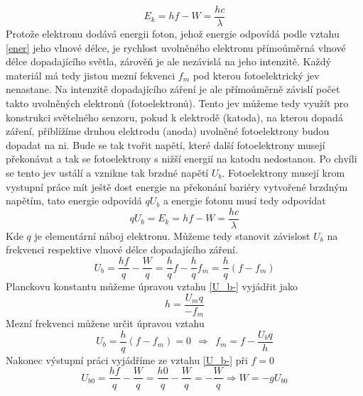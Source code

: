 \documentclass{article}
\begin{document}
\begin{equation}
    E_k=hf-W=\frac{hc}{\lambda}
    \label{E_ki}
\end{equation}
Protože elektronu dodává energii foton, jehož energie odpovídá podle vztahu \ref{ener} jeho vlnové délce, je rychlost uvolněného elektronu přímoúměrná vlnové délce dopadajícího světla, zárověň je ale nezávislá na jeho intenzitě.
Každý materiál má tedy jistou mezní fekvenci \(f_m\) pod kterou fotoelektrický jev nenastane.
Na intenzitě dopadajícího záření je ale přímoúměrně závislí počet takto uvolněných elektronů (fotoelektronů).
Tento jev můžeme tedy využít pro konstrukci světelného senzoru, pokud k elektrodě (katoda), na kterou dopadá záření, přiblížíme druhou elektrodu (anoda) uvolněné fotoelektrony budou dopadat na ni.
Bude se tak tvořit napětí, které další fotoelektrony musejí překonávat a tak se fotoelektrony s nižší energií na katodu nedostanou.
Po chvíli se tento jev ustálí a vznikne tak brzdné napětí \(U_b\).
Fotoelektrony musejí krom vystupní práce mít ještě dost energie na překonání bariéry vytvořené brzdným napětím, tato energie odpovídá \(qU_b\) a energie fotonu musí tedy odpovídat 
\begin{equation}
    qU_b=E_k=hf-W=\frac{hc}{\lambda}
    \label{eU_b}
\end{equation}
Kde \(q\) je elementární náboj elektronu.
Můžeme tedy stanovit závislost \(U_b\) na frekvenci respektive vlnové délce dopadajícího záření.
\begin{equation}
    U_b=\frac{hf}{q}-\frac{W}{q}=\frac{h}{q}f-\frac{h}{q}f_m=\frac{h}{q}(f-f_m)
    \label{U_b-}
\end{equation}
Planckovu konstantu můžeme úpravou vztahu \ref{U_b-} vyjádřit jako
\begin{equation}
    h=\frac{U_mq}{-f_m}
    \label{plan}
\end{equation}
Mezní frekvenci můžene určit úpravou vztahu
\begin{equation}
    U_b=\frac{h}{q}(f-f_m)=0 ~~ \Longrightarrow ~~ f_m=f-\frac{U_bq}{h}
    \label{f_m}
\end{equation}
Nakonec výstupní práci vyjádříme ze vztahu \ref{U_b-} při \(f=0\)
\begin{equation}
    U_{b0}=\frac{hf}{q}-\frac{W}{q}=\frac{h0}{q}-\frac{W}{q}=-\frac{W}{q}\Rightarrow W=-gU_{b0}
    \label{V-b0}
\end{equation}
\end{document}
